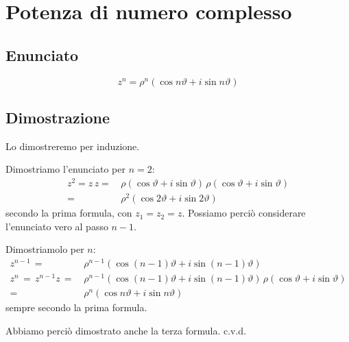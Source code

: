 \documentclass[../../dimostrazioni]{subfiles}
\begin{document}
        \newpage

        \section*{Potenza di numero complesso}

            \subsection*{Enunciato}

                \[ z^n = \rho^n (\cos n\vartheta +i\sin n\vartheta)\]

            \subsection*{Dimostrazione}

                Lo dimostreremo per induzione.

                Dimostriamo l'enunciato per \(n = 2\):
                \begin{align*}
                    z^2 = z \, z =& \, \rho(\cos\vartheta+i\sin\vartheta) \, \rho(\cos\vartheta+i\sin\vartheta)\\
                                      =& \, \rho^2(\cos2\vartheta + i\sin2\vartheta)
                \end{align*}
                secondo la prima formula, con \(z_1 = z_2 = z\).
                Possiamo perciò considerare l'enunciato vero al passo \(n - 1\).

                Dimostriamolo per \(n\):
                \begin{align*}
                    z^{n - 1} \, =& \, \rho^{n - 1} (\cos (n - 1)\vartheta + i \sin (n - 1)\vartheta)\\
                    z^{n} \, = \, z^{n - 1} z \, =& \, \rho^{n - 1} (\cos (n - 1)\vartheta + i \sin (n - 1)\vartheta) \, \rho(\cos \vartheta + i \sin \vartheta) \\
                                               =& \, \rho^n (\cos n\vartheta + i\sin n\vartheta)
                \end{align*}
                sempre secondo la prima formula.

                Abbiamo perciò dimostrato anche la terza formula. c.v.d.
            
\end{document}
